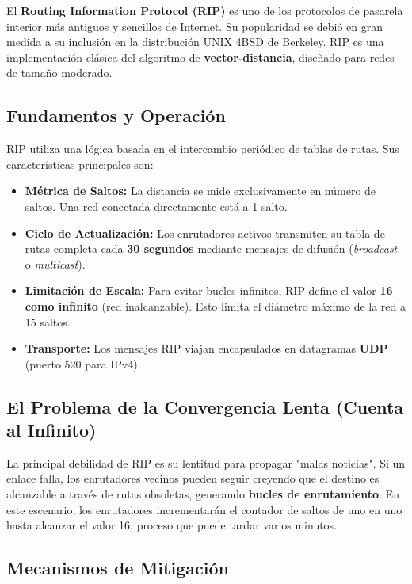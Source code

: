 El \textbf{Routing Information Protocol (RIP)} es uno de los protocolos de pasarela interior más antiguos y sencillos de Internet. Su popularidad se debió en gran medida a su inclusión en la distribución UNIX 4BSD de Berkeley. RIP es una implementación clásica del algoritmo de \textbf{vector-distancia}, diseñado para redes de tamaño moderado.

\subsection{Fundamentos y Operación}

RIP utiliza una lógica basada en el intercambio periódico de tablas de rutas. Sus características principales son:

\begin{itemize}
	\item \textbf{Métrica de Saltos:} La distancia se mide exclusivamente en número de saltos. Una red conectada directamente está a 1 salto.
	\item \textbf{Ciclo de Actualización:} Los enrutadores activos transmiten su tabla de rutas completa cada \textbf{30 segundos} mediante mensajes de difusión (\textit{broadcast} o \textit{multicast}).
	\item \textbf{Limitación de Escala:} Para evitar bucles infinitos, RIP define el valor \textbf{16 como infinito} (red inalcanzable). Esto limita el diámetro máximo de la red a 15 saltos.
	\item \textbf{Transporte:} Los mensajes RIP viajan encapsulados en datagramas \textbf{UDP} (puerto 520 para IPv4).
\end{itemize}

\subsection{El Problema de la Convergencia Lenta (Cuenta al Infinito)}

La principal debilidad de RIP es su lentitud para propagar "malas noticias". Si un enlace falla, los enrutadores vecinos pueden seguir creyendo que el destino es alcanzable a través de rutas obsoletas, generando \textbf{bucles de enrutamiento}. En este escenario, los enrutadores incrementarán el contador de saltos de uno en uno hasta alcanzar el valor 16, proceso que puede tardar varios minutos.

\subsection{Mecanismos de Mitigación}

